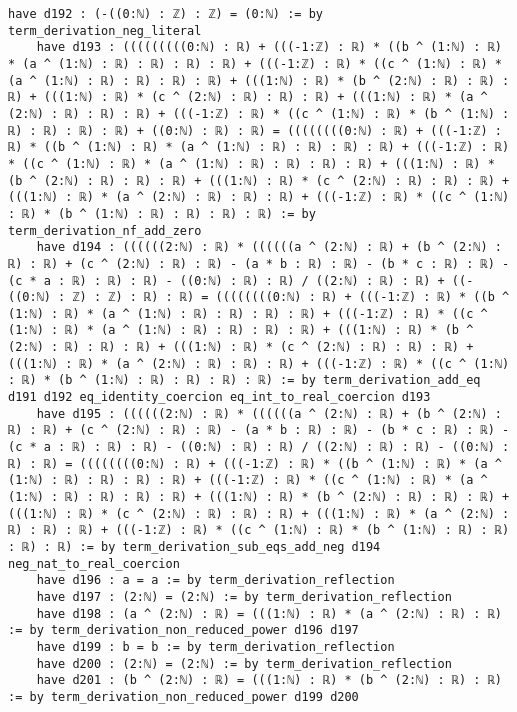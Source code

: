 \documentclass{article}
\begin{document}
\begin{tcolorbox}[colback=white!10, width=\linewidth]
\begin{lstlisting}[language=Lean4]
    have d192 : (-((0:ℕ) : ℤ) : ℤ) = (0:ℕ) := by term_derivation_neg_literal
    have d193 : (((((((((0:ℕ) : ℝ) + (((-1:ℤ) : ℝ) * ((b ^ (1:ℕ) : ℝ) * (a ^ (1:ℕ) : ℝ) : ℝ) : ℝ) : ℝ) + (((-1:ℤ) : ℝ) * ((c ^ (1:ℕ) : ℝ) * (a ^ (1:ℕ) : ℝ) : ℝ) : ℝ) : ℝ) + (((1:ℕ) : ℝ) * (b ^ (2:ℕ) : ℝ) : ℝ) : ℝ) + (((1:ℕ) : ℝ) * (c ^ (2:ℕ) : ℝ) : ℝ) : ℝ) + (((1:ℕ) : ℝ) * (a ^ (2:ℕ) : ℝ) : ℝ) : ℝ) + (((-1:ℤ) : ℝ) * ((c ^ (1:ℕ) : ℝ) * (b ^ (1:ℕ) : ℝ) : ℝ) : ℝ) : ℝ) + ((0:ℕ) : ℝ) : ℝ) = ((((((((0:ℕ) : ℝ) + (((-1:ℤ) : ℝ) * ((b ^ (1:ℕ) : ℝ) * (a ^ (1:ℕ) : ℝ) : ℝ) : ℝ) : ℝ) + (((-1:ℤ) : ℝ) * ((c ^ (1:ℕ) : ℝ) * (a ^ (1:ℕ) : ℝ) : ℝ) : ℝ) : ℝ) + (((1:ℕ) : ℝ) * (b ^ (2:ℕ) : ℝ) : ℝ) : ℝ) + (((1:ℕ) : ℝ) * (c ^ (2:ℕ) : ℝ) : ℝ) : ℝ) + (((1:ℕ) : ℝ) * (a ^ (2:ℕ) : ℝ) : ℝ) : ℝ) + (((-1:ℤ) : ℝ) * ((c ^ (1:ℕ) : ℝ) * (b ^ (1:ℕ) : ℝ) : ℝ) : ℝ) : ℝ) := by term_derivation_nf_add_zero
    have d194 : ((((((2:ℕ) : ℝ) * ((((((a ^ (2:ℕ) : ℝ) + (b ^ (2:ℕ) : ℝ) : ℝ) + (c ^ (2:ℕ) : ℝ) : ℝ) - (a * b : ℝ) : ℝ) - (b * c : ℝ) : ℝ) - (c * a : ℝ) : ℝ) : ℝ) - ((0:ℕ) : ℝ) : ℝ) / ((2:ℕ) : ℝ) : ℝ) + ((-((0:ℕ) : ℤ) : ℤ) : ℝ) : ℝ) = ((((((((0:ℕ) : ℝ) + (((-1:ℤ) : ℝ) * ((b ^ (1:ℕ) : ℝ) * (a ^ (1:ℕ) : ℝ) : ℝ) : ℝ) : ℝ) + (((-1:ℤ) : ℝ) * ((c ^ (1:ℕ) : ℝ) * (a ^ (1:ℕ) : ℝ) : ℝ) : ℝ) : ℝ) + (((1:ℕ) : ℝ) * (b ^ (2:ℕ) : ℝ) : ℝ) : ℝ) + (((1:ℕ) : ℝ) * (c ^ (2:ℕ) : ℝ) : ℝ) : ℝ) + (((1:ℕ) : ℝ) * (a ^ (2:ℕ) : ℝ) : ℝ) : ℝ) + (((-1:ℤ) : ℝ) * ((c ^ (1:ℕ) : ℝ) * (b ^ (1:ℕ) : ℝ) : ℝ) : ℝ) : ℝ) := by term_derivation_add_eq d191 d192 eq_identity_coercion eq_int_to_real_coercion d193
    have d195 : ((((((2:ℕ) : ℝ) * ((((((a ^ (2:ℕ) : ℝ) + (b ^ (2:ℕ) : ℝ) : ℝ) + (c ^ (2:ℕ) : ℝ) : ℝ) - (a * b : ℝ) : ℝ) - (b * c : ℝ) : ℝ) - (c * a : ℝ) : ℝ) : ℝ) - ((0:ℕ) : ℝ) : ℝ) / ((2:ℕ) : ℝ) : ℝ) - ((0:ℕ) : ℝ) : ℝ) = ((((((((0:ℕ) : ℝ) + (((-1:ℤ) : ℝ) * ((b ^ (1:ℕ) : ℝ) * (a ^ (1:ℕ) : ℝ) : ℝ) : ℝ) : ℝ) + (((-1:ℤ) : ℝ) * ((c ^ (1:ℕ) : ℝ) * (a ^ (1:ℕ) : ℝ) : ℝ) : ℝ) : ℝ) + (((1:ℕ) : ℝ) * (b ^ (2:ℕ) : ℝ) : ℝ) : ℝ) + (((1:ℕ) : ℝ) * (c ^ (2:ℕ) : ℝ) : ℝ) : ℝ) + (((1:ℕ) : ℝ) * (a ^ (2:ℕ) : ℝ) : ℝ) : ℝ) + (((-1:ℤ) : ℝ) * ((c ^ (1:ℕ) : ℝ) * (b ^ (1:ℕ) : ℝ) : ℝ) : ℝ) : ℝ) := by term_derivation_sub_eqs_add_neg d194 neg_nat_to_real_coercion
    have d196 : a = a := by term_derivation_reflection
    have d197 : (2:ℕ) = (2:ℕ) := by term_derivation_reflection
    have d198 : (a ^ (2:ℕ) : ℝ) = (((1:ℕ) : ℝ) * (a ^ (2:ℕ) : ℝ) : ℝ) := by term_derivation_non_reduced_power d196 d197
    have d199 : b = b := by term_derivation_reflection
    have d200 : (2:ℕ) = (2:ℕ) := by term_derivation_reflection
    have d201 : (b ^ (2:ℕ) : ℝ) = (((1:ℕ) : ℝ) * (b ^ (2:ℕ) : ℝ) : ℝ) := by term_derivation_non_reduced_power d199 d200

\end{lstlisting}
\end{tcolorbox}
\end{document}
